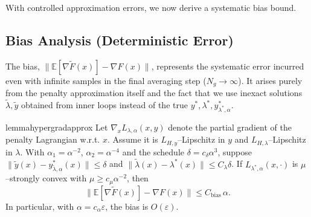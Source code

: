 \documentclass[letterpaper]{article} %
\newcommand{\1}{\mathbf{1}}
\begin{document}
With controlled approximation errors, we now derive a systematic bias bound.
\subsection{Bias Analysis (Deterministic Error)}

The bias, $\|\mathbb{E}[\nabla\tilde{F}(x)] - \nabla F(x)\|$, represents the systematic error incurred even with infinite samples in the final averaging step ($N_g \to \infty$). It arises purely from the penalty approximation itself and the fact that we use inexact solutions $\tilde{\lambda}, \tilde{y}$ obtained from inner loops instead of the true $y^*, \lambda^*, y^*_{\lambda^*,\alpha}$.

\begin{restatable}{lemma}{hypergradapprox}
\label{lemma:bias_bound}
Let $\nabla_x L_{\lambda,\alpha}(x,y)$ denote the partial gradient of the penalty Lagrangian w.r.t. $x$. Assume it is $L_{H,y}$–Lipschitz in $y$ and $L_{H,\lambda}$–Lipschitz in $\lambda$. With $\alpha_1=\alpha^{-2}$, $\alpha_2=\alpha^{-4}$ and the schedule $\delta=c_{\delta}\alpha^{3}$, suppose $\|\tilde{y}(x)-y^*_{\tilde{\lambda},\alpha}(x)\|\le\delta$ and $\|\tilde{\lambda}(x)-\lambda^*(x)\|\le C_\lambda\delta$. If $L_{\lambda^*,\alpha}(x,\cdot)$ is $\mu$–strongly convex with $\mu\ge c_\mu\alpha^{-2}$, then
\[
\| \mathbb{E}[\nabla\tilde{F}(x)] - \nabla F(x) \| \le C_{\text{bias}}\,\alpha.
\]
In particular, with $\alpha=c_{\alpha}\varepsilon$, the bias is $O(\varepsilon)$.
\end{restatable}
\end{document}
